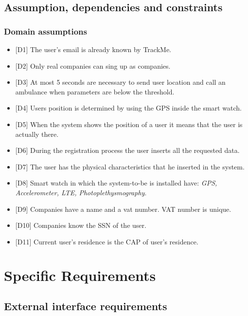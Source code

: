 \documentclass{article}
\begin{document}
\subsection{Assumption, dependencies and constraints}
\subsubsection{Domain assumptions}
\begin{itemize}
	\item {[D1]} The user's email is already known by TrackMe.
	\item {[D2]} Only real companies can sing up as companies.
	\item {[D3]}  At most 5 seconds are necessary to send user location and call an ambulance when parameters are below the threshold.
	\item {[D4]} Users position is determined by using the GPS inside the smart watch.
	\item {[D5]} When the system shows the position of a user it means that the user is
actually there.
	\item {[D6]} During the registration process the user inserts all the requested data.
	\item {[D7]} The user has the physical characteristics that he inserted in the system.
	\item {[D8]} Smart watch in which the system-to-be is installed have: \emph{GPS, Accelerometer, LTE, Photoplethysmography}.
	\item {[D9]} Companies have a name and a vat number. VAT number is unique.
	\item {[D10]} Companies know the SSN of the user.  
	\item {[D11]} Current user's residence is the CAP of user's residence. 
\end{itemize}\newpage
\section{Specific Requirements}
\subsection{External interface requirements}
\end{document}
